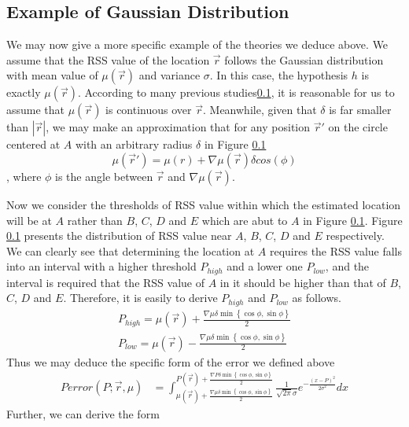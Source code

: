 \documentclass[10pt,conference,compsocconf,letterpaper]{IEEEtran}
\begin{document}
\subsection{Example of Gaussian Distribution}
We may now give a more specific example of the theories we deduce above. We assume that the RSS value of the location $\vec r$ follows the Gaussian distribution with mean value of $\mu{(\vec r)}$ and variance $\sigma$. In this case, the hypothesis $h$ is exactly $\mu{(\vec r)}$. According to many previous studies\ref{}, it is reasonable for us to assume that $\mu{(\vec r)}$ is continuous over $\vec r$. Meanwhile, given that $\delta$ is far smaller than $|\vec r|$, we may make an approximation that for any position $\vec r'$ on the circle centered at $A$ with an arbitrary radius $\delta$ in Figure \ref{}
\begin{equation}
\mu(\vec r')=\mu(r)+\nabla \mu(\vec r)\delta cos(\phi)
\end{equation}
, where $\phi$ is the angle between $\vec r$ and $\nabla \mu(\vec r)$.

Now we consider the thresholds of RSS value within which the estimated location will be at $A$ rather than $B$, $C$, $D$ and $E$ which are abut to $A$ in Figure \ref{}. Figure \ref{} presents the distribution of RSS value near $A$, $B$, $C$, $D$ and $E$ respectively. We can clearly see that determining the location at $A$ requires the RSS value falls into an interval with a higher threshold ${P_{high}}$ and a lower one ${P_{low}}$, and the interval is required that the RSS value of $A$ in it should be higher than that of $B$, $C$, $D$ and $E$. Therefore, it is easily to derive ${P_{high}}$ and ${P_{low}}$ as follows.
\begin{equation}
\begin{aligned}
{P_{high}} = \mu (\vec r) + \frac{{\nabla\mu\delta \min \left\{ {\cos \phi ,\sin \phi } \right\}}}{2}\\
{P_{low}} = \mu (\vec r) - \frac{{\nabla\mu\delta \min \left\{ {\cos \phi ,\sin \phi } \right\}}}{2}
\end{aligned}
\end{equation}
Thus we may deduce the specific form of the error we defined above
\begin{equation}
\begin{aligned}
Perror(P;\vec r,\mu) &=\int_{ \mu (\vec r) + \frac{{\nabla\mu\delta \min \left\{ {\cos \phi ,\sin \phi } \right\}}}{2}}^{P (\vec r) + \frac{{\nabla P \delta \min \left\{ {\cos \phi ,\sin \phi } \right\}}}{2}}\frac{1}{\sqrt{2\pi}\sigma}e^{-\frac{(x-P)^2}{2\sigma^2}}dx
\end{aligned}
\end{equation}
Further, we can derive the form 
\end{document}
